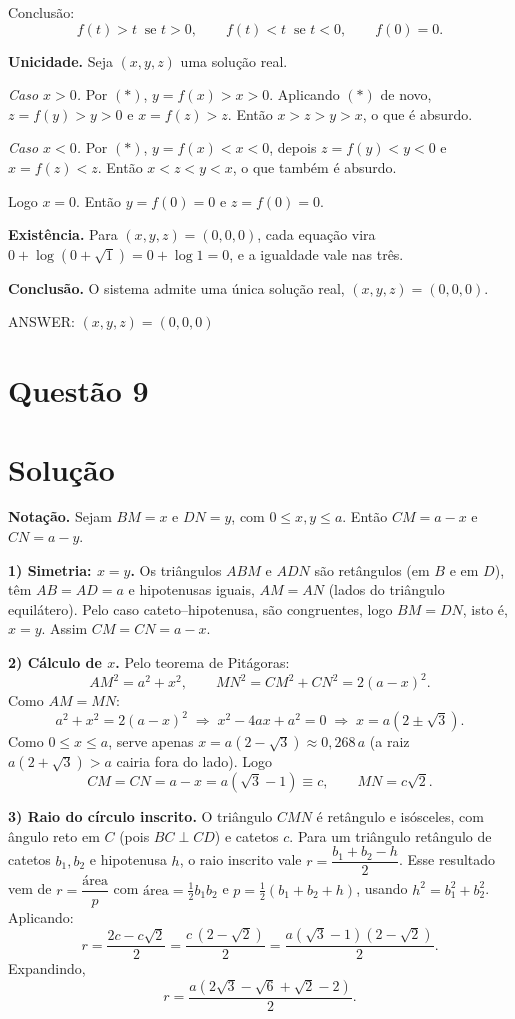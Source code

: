 \documentclass{article}%
\begin{document}
Conclusão:
\[
f(t)>t \ \text{ se } t>0,\qquad f(t)<t \ \text{ se } t<0,\qquad f(0)=0. \tag{$*$}
\]

\textbf{Unicidade.} Seja $(x,y,z)$ uma solução real.

\emph{Caso $x>0$.} Por $(*)$, $y=f(x)>x>0$. Aplicando $(*)$ de novo, $z=f(y)>y>0$ e $x=f(z)>z$. Então $x>z>y>x$, o que é absurdo.

\emph{Caso $x<0$.} Por $(*)$, $y=f(x)<x<0$, depois $z=f(y)<y<0$ e $x=f(z)<z$. Então $x<z<y<x$, o que também é absurdo.

Logo $x=0$. Então $y=f(0)=0$ e $z=f(0)=0$.

\textbf{Existência.} Para $(x,y,z)=(0,0,0)$, cada equação vira $0+\log\!\left(0+\sqrt{1}\right)=0+\log 1=0$, e a igualdade vale nas três.

\textbf{Conclusão.} O sistema admite uma única solução real, $(x,y,z)=(0,0,0)$.

ANSWER: $(x,y,z)=(0,0,0)$
%
\newpage%
\section*{Questão 9}

\section*{Solução}

\textbf{Notação.} Sejam $BM=x$ e $DN=y$, com $0\le x,y\le a$. Então $CM=a-x$ e $CN=a-y$.

\textbf{1) Simetria: $x=y$.} Os triângulos $ABM$ e $ADN$ são retângulos (em $B$ e em $D$), têm $AB=AD=a$ e hipotenusas iguais, $AM=AN$ (lados do triângulo equilátero). Pelo caso cateto--hipotenusa, são congruentes, logo $BM=DN$, isto é, $x=y$. Assim $CM=CN=a-x$.

\textbf{2) Cálculo de $x$.} Pelo teorema de Pitágoras:
\[
AM^2=a^2+x^2,\qquad MN^2=CM^2+CN^2=2(a-x)^2 .
\]
Como $AM=MN$:
\[
a^2+x^2=2(a-x)^2 \;\Longrightarrow\; x^2-4ax+a^2=0 \;\Longrightarrow\; x=a(2\pm\sqrt3).
\]
Como $0\le x\le a$, serve apenas $x=a(2-\sqrt3)\approx 0{,}268\,a$ (a raiz $a(2+\sqrt3)>a$ cairia fora do lado). Logo
\[
CM=CN=a-x=a(\sqrt3-1)\equiv c,\qquad MN=c\sqrt2 .
\]

\textbf{3) Raio do círculo inscrito.} O triângulo $CMN$ é retângulo e isósceles, com ângulo reto em $C$ (pois $BC\perp CD$) e catetos $c$. Para um triângulo retângulo de catetos $b_1,b_2$ e hipotenusa $h$, o raio inscrito vale $r=\dfrac{b_1+b_2-h}{2}$. Esse resultado vem de $r=\dfrac{\text{área}}{p}$ com $\text{área}=\tfrac12 b_1b_2$ e $p=\tfrac12(b_1+b_2+h)$, usando $h^2=b_1^2+b_2^2$. Aplicando:
\[
r=\frac{2c-c\sqrt2}{2}=\frac{c\,(2-\sqrt2)}{2}=\frac{a(\sqrt3-1)(2-\sqrt2)}{2}.
\]
Expandindo,
\[
r=\frac{a\left(2\sqrt3-\sqrt6+\sqrt2-2\right)}{2}.
\]
\end{document}
